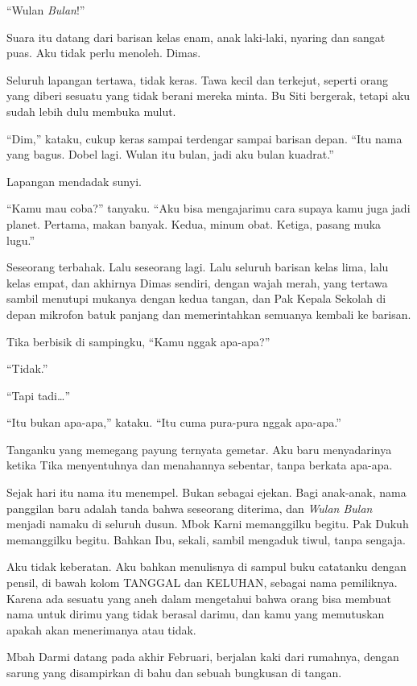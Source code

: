 \documentclass[11pt,twoside,openany]{book}
\makeatletter
\newcommand{\scenebreak}{\par\vspace{0.9em}{\centering\textsc{*\hspace{0.7em}*\hspace{0.7em}*}\par}\vspace{0.9em}\@afterindentfalse\@afterheading}
\makeatother
\begin{document}
``Wulan \emph{Bulan}!''

Suara itu datang dari barisan kelas enam, anak laki-laki, nyaring dan sangat puas. Aku tidak perlu menoleh. Dimas.

Seluruh lapangan tertawa, tidak keras. Tawa kecil dan terkejut, seperti orang yang diberi sesuatu yang tidak berani mereka minta. Bu Siti bergerak, tetapi aku sudah lebih dulu membuka mulut.

``Dim,'' kataku, cukup keras sampai terdengar sampai barisan depan. ``Itu nama yang bagus. Dobel lagi. Wulan itu bulan, jadi aku bulan kuadrat.''

Lapangan mendadak sunyi.

``Kamu mau coba?'' tanyaku. ``Aku bisa mengajarimu cara supaya kamu juga jadi planet. Pertama, makan banyak. Kedua, minum obat. Ketiga, pasang muka lugu.''

Seseorang terbahak. Lalu seseorang lagi. Lalu seluruh barisan kelas lima, lalu kelas empat, dan akhirnya Dimas sendiri, dengan wajah merah, yang tertawa sambil menutupi mukanya dengan kedua tangan, dan Pak Kepala Sekolah di depan mikrofon batuk panjang dan memerintahkan semuanya kembali ke barisan.

Tika berbisik di sampingku, ``Kamu nggak apa-apa?''

``Tidak.''

``Tapi tadi\ldots{}''

``Itu bukan apa-apa,'' kataku. ``Itu cuma pura-pura nggak apa-apa.''

Tanganku yang memegang payung ternyata gemetar. Aku baru menyadarinya ketika Tika menyentuhnya dan menahannya sebentar, tanpa berkata apa-apa.

\scenebreak
Sejak hari itu nama itu menempel. Bukan sebagai ejekan. Bagi anak-anak, nama panggilan baru adalah tanda bahwa seseorang diterima, dan \emph{Wulan Bulan} menjadi namaku di seluruh dusun. Mbok Karni memanggilku begitu. Pak Dukuh memanggilku begitu. Bahkan Ibu, sekali, sambil mengaduk tiwul, tanpa sengaja.

Aku tidak keberatan. Aku bahkan menulisnya di sampul buku catatanku dengan pensil, di bawah kolom TANGGAL dan KELUHAN, sebagai nama pemiliknya. Karena ada sesuatu yang aneh dalam mengetahui bahwa orang bisa membuat nama untuk dirimu yang tidak berasal darimu, dan kamu yang memutuskan apakah akan menerimanya atau tidak.

\scenebreak
Mbah Darmi datang pada akhir Februari, berjalan kaki dari rumahnya, dengan sarung yang disampirkan di bahu dan sebuah bungkusan di tangan.
\end{document}

